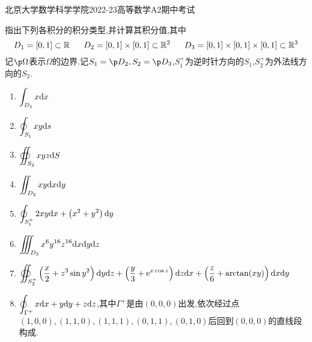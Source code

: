 \documentclass{ctexart}
\begin{document}
\pagestyle{empty}
\begin{center}\Large
    北京大学数学科学学院2022-23高等数学A2期中考试
\end{center}
\begin{problem}[1.(32\songti{分})]
    指出下列各积分的积分类型,并计算其积分值,其中
    \[D_1=[0,1]\subset\R\ \ \ \ \ D_2=[0,1]\times[0,1]\subset\R^2\ \ \ \ \ D_3=[0,1]\times[0,1]\times[0,1]\subset\R^3\]
    记$\p\Omega$表示$\Omega$的边界.记$S_1=\p D_2,S_2=\p D_3$,$S_1^+$为逆时针方向的$S_1$,$S_2^+$为外法线方向的$S_2$.
    \begin{enumerate}[label=\tbf{(\arabic*)}]
        \item $\displaystyle\int_{D_1}x\mathrm{d} x$
        \item $\displaystyle\oint_{S_1}xy\mathrm{d} s$
        \item $\displaystyle\oiint_{S_2}xyz\mathrm{d} S$
        \item $\displaystyle\iint_{D_2}xy\mathrm{d} x\mathrm{d} y$
        \item $\displaystyle\oint_{S_1^+}2xy\mathrm{d} x+\left(x^2+y^2\right)\mathrm{d} y$
        \item $\displaystyle\iiint_{D_3}x^6y^{16}z^{16}\mathrm{d} x\mathrm{d} y\mathrm{d} z$
        \item $\displaystyle\oiint_{S_2^+}\left(\dfrac x2+z^3\sin y^2\right)\mathrm{d} y\mathrm{d} z+\left(\dfrac y3+\mathrm{e}^{x\cos z}\right)\mathrm{d} z\mathrm{d} x+\left(\dfrac z6+\arctan(xy)\right)\mathrm{d} x\mathrm{d} y$
        \item $\displaystyle\oint_{\Gamma^+}x\mathrm{d} x+y\mathrm{d} y+z\mathrm{d} z$,其中$\Gamma^+$是由$(0,0,0)$出发,依次经过点$(1,0,0),(1,1,0),(1,1,1),(0,1,1),(0,1,0)$后回到$(0,0,0)$的直线段构成.
    \end{enumerate}

\end{problem}
\end{document}
